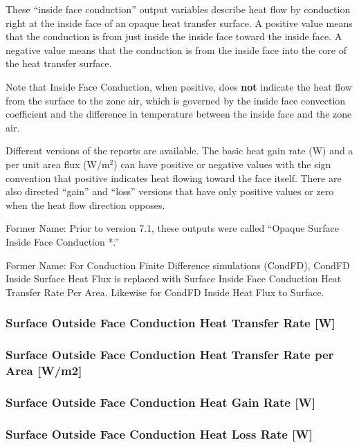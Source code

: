 These ``inside face conduction'' output variables describe heat flow by conduction right at the inside face of an opaque heat transfer surface. A positive value means that the conduction is from just inside the inside face toward the inside face. A negative value means that the conduction is from the inside face into the core of the heat transfer surface.

Note that Inside Face Conduction, when positive, does \textbf{not} indicate the heat flow from the surface to the zone air, which is governed by the inside face convection coefficient and the difference in temperature between the inside face and the zone air.

Different versions of the reports are available. The basic heat gain rate (W) and a per unit area flux (W/m\(^{2}\)) can have positive or negative values with the sign convention that positive indicates heat flowing toward the face itself. There are also directed ``gain'' and ``loss'' versions that have only positive values or zero when the heat flow direction opposes.

Former Name: Prior to version 7.1, these outputs were called ``Opaque Surface Inside Face Conduction *.''

Former Name: For Conduction Finite Difference simulations (CondFD), CondFD Inside Surface Heat Flux is replaced with Surface Inside Face Conduction Heat Transfer Rate Per Area. Likewise for CondFD Inside Heat Flux to Surface.

\subsubsection{Surface Outside Face Conduction Heat Transfer Rate {[}W{]}}\label{surface-outside-face-conduction-heat-transfer-rate-w}

\subsubsection{Surface Outside Face Conduction Heat Transfer Rate per Area {[}W/m2{]}}\label{surface-outside-face-conduction-heat-transfer-rate-per-area-wm2}

\subsubsection{Surface Outside Face Conduction Heat Gain Rate {[}W{]}}\label{surface-outside-face-conduction-heat-gain-rate-w}

\subsubsection{Surface Outside Face Conduction Heat Loss Rate {[}W{]}}\label{surface-outside-face-conduction-heat-loss-rate-w}

